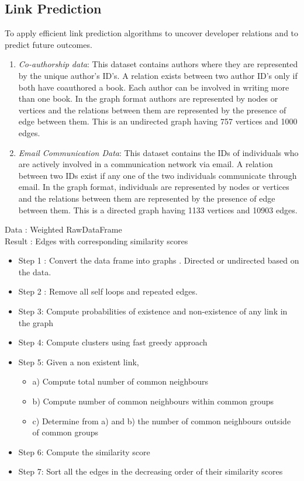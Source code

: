 \subsection{Link Prediction}

 To apply efficient link prediction algorithms to uncover developer
relations and to predict future outcomes.

\begin{enumerate}
\item {\em Co-authorship data}: This dataset contains authors where they are represented by the unique author's ID's.
A relation exists between two author ID's only if both have coauthored a book. Each author can be involved
in writing more than one book. In the graph format authors are represented by nodes or vertices and the
relations between them are represented by the presence of edge between them.
This is an undirected graph having 757 vertices and 1000 edges. 

\item {\em Email Communication Data}: This dataset contains the IDs of individuals who are actively involved
in a communication network via email. A relation between two IDs exist if any one of the two individuals
communicate through email. In the graph format, individuals are represented by nodes or vertices and the
relations between them are represented by the presence of edge between them. This is a directed graph having 1133 vertices and 10903 edges.
\end{enumerate}


\noindent Data : Weighted RawDataFrame\\
\noindent Result : Edges with corresponding similarity scores

\begin{itemize}
\item Step 1 : Convert the data frame into graphs . Directed or undirected based on the data.
\item Step 2 : Remove all self loops and repeated edges.
\item Step 3: Compute probabilities of existence and non-existence of any link in the graph
\item Step 4: Compute clusters using fast greedy approach
\item Step 5: Given a non existent link,
\begin{itemize}
\item a) Compute total number of common neighbours
\item b) Compute number of common neighbours within common groups
\item c) Determine from a) and b) the number of common neighbours outside of common groups
\end{itemize}
\item Step 6: Compute the similarity score
\item Step 7: Sort all the edges in the decreasing order of their similarity scores
\end{itemize}

